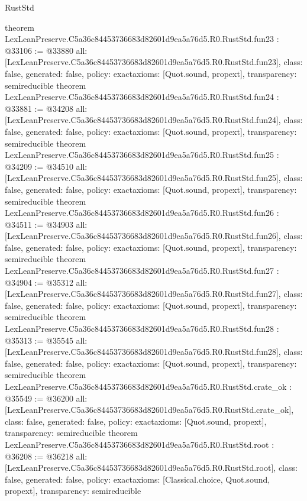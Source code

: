 \begin{lexlean}{RustStd}
\begin{coremodule}
{}
theorem LexLeanPreserve.C5a36c84453736683d82601d9ea5a76d5.R0.RustStd.fun23 : @33106 := @33880 {
  all: [LexLeanPreserve.C5a36c84453736683d82601d9ea5a76d5.R0.RustStd.fun23],
  class: false,
  generated: false,
  policy: exact{axioms: [Quot.sound, propext]},
  transparency: semireducible
}
theorem LexLeanPreserve.C5a36c84453736683d82601d9ea5a76d5.R0.RustStd.fun24 : @33881 := @34208 {
  all: [LexLeanPreserve.C5a36c84453736683d82601d9ea5a76d5.R0.RustStd.fun24],
  class: false,
  generated: false,
  policy: exact{axioms: [Quot.sound, propext]},
  transparency: semireducible
}
theorem LexLeanPreserve.C5a36c84453736683d82601d9ea5a76d5.R0.RustStd.fun25 : @34209 := @34510 {
  all: [LexLeanPreserve.C5a36c84453736683d82601d9ea5a76d5.R0.RustStd.fun25],
  class: false,
  generated: false,
  policy: exact{axioms: [Quot.sound, propext]},
  transparency: semireducible
}
theorem LexLeanPreserve.C5a36c84453736683d82601d9ea5a76d5.R0.RustStd.fun26 : @34511 := @34903 {
  all: [LexLeanPreserve.C5a36c84453736683d82601d9ea5a76d5.R0.RustStd.fun26],
  class: false,
  generated: false,
  policy: exact{axioms: [Quot.sound, propext]},
  transparency: semireducible
}
theorem LexLeanPreserve.C5a36c84453736683d82601d9ea5a76d5.R0.RustStd.fun27 : @34904 := @35312 {
  all: [LexLeanPreserve.C5a36c84453736683d82601d9ea5a76d5.R0.RustStd.fun27],
  class: false,
  generated: false,
  policy: exact{axioms: [Quot.sound, propext]},
  transparency: semireducible
}
theorem LexLeanPreserve.C5a36c84453736683d82601d9ea5a76d5.R0.RustStd.fun28 : @35313 := @35545 {
  all: [LexLeanPreserve.C5a36c84453736683d82601d9ea5a76d5.R0.RustStd.fun28],
  class: false,
  generated: false,
  policy: exact{axioms: [Quot.sound, propext]},
  transparency: semireducible
}
theorem LexLeanPreserve.C5a36c84453736683d82601d9ea5a76d5.R0.RustStd.crate_ok : @35549 := @36200 {
  all: [LexLeanPreserve.C5a36c84453736683d82601d9ea5a76d5.R0.RustStd.crate_ok],
  class: false,
  generated: false,
  policy: exact{axioms: [Quot.sound, propext]},
  transparency: semireducible
}
theorem LexLeanPreserve.C5a36c84453736683d82601d9ea5a76d5.R0.RustStd.root : @36208 := @36218 {
  all: [LexLeanPreserve.C5a36c84453736683d82601d9ea5a76d5.R0.RustStd.root],
  class: false,
  generated: false,
  policy: exact{axioms: [Classical.choice, Quot.sound, propext]},
  transparency: semireducible
}


\end{coremodule}
\end{lexlean}
